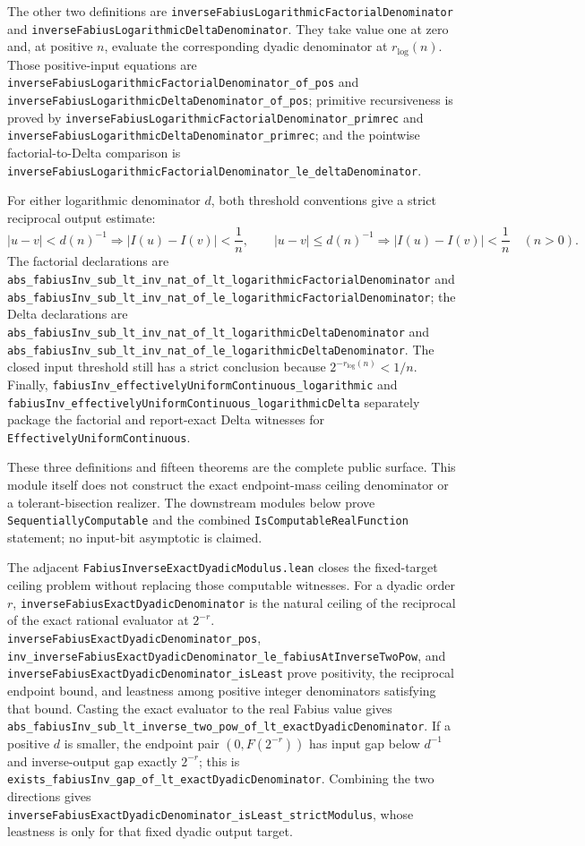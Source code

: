 \documentclass[11pt,oneside]{article}
\theoremstyle{definition}
\theoremstyle{remark}
\begin{document}
The other two definitions are
\nolinkurl{inverseFabiusLogarithmicFactorialDenominator} and
\nolinkurl{inverseFabiusLogarithmicDeltaDenominator}.  They take value one
at zero and, at positive \(n\), evaluate the corresponding dyadic denominator
at \(r_{\log}(n)\).  Those positive-input equations are
\nolinkurl{inverseFabiusLogarithmicFactorialDenominator_of_pos} and
\nolinkurl{inverseFabiusLogarithmicDeltaDenominator_of_pos}; primitive
recursiveness is proved by
\nolinkurl{inverseFabiusLogarithmicFactorialDenominator_primrec} and
\nolinkurl{inverseFabiusLogarithmicDeltaDenominator_primrec}; and the
pointwise factorial-to-Delta comparison is
\nolinkurl{inverseFabiusLogarithmicFactorialDenominator_le_deltaDenominator}.

For either logarithmic denominator \(d\), both threshold conventions give a
strict reciprocal output estimate:
\[
 |u-v|<d(n)^{-1}\Longrightarrow |I(u)-I(v)|<\frac1n,\qquad
 |u-v|\le d(n)^{-1}\Longrightarrow |I(u)-I(v)|<\frac1n
 \quad(n>0).
\]
The factorial declarations are
\nolinkurl{abs_fabiusInv_sub_lt_inv_nat_of_lt_logarithmicFactorialDenominator}
and
\nolinkurl{abs_fabiusInv_sub_lt_inv_nat_of_le_logarithmicFactorialDenominator};
the Delta declarations are
\nolinkurl{abs_fabiusInv_sub_lt_inv_nat_of_lt_logarithmicDeltaDenominator}
and
\nolinkurl{abs_fabiusInv_sub_lt_inv_nat_of_le_logarithmicDeltaDenominator}.
The closed input threshold still has a strict conclusion because
\(2^{-r_{\log}(n)}<1/n\).  Finally,
\nolinkurl{fabiusInv_effectivelyUniformContinuous_logarithmic} and
\nolinkurl{fabiusInv_effectivelyUniformContinuous_logarithmicDelta}
separately package the factorial and report-exact Delta witnesses for
\nolinkurl{EffectivelyUniformContinuous}.

These three definitions and fifteen theorems are the complete public surface.
This module itself does not construct the exact endpoint-mass ceiling
denominator or a tolerant-bisection realizer.  The downstream modules below
prove \nolinkurl{SequentiallyComputable} and the combined
\nolinkurl{IsComputableRealFunction} statement; no input-bit asymptotic is
claimed.

The adjacent \nolinkurl{FabiusInverseExactDyadicModulus.lean} closes the
fixed-target ceiling problem without replacing those computable witnesses.
For a dyadic order \(r\),
\nolinkurl{inverseFabiusExactDyadicDenominator} is the natural ceiling of the
reciprocal of the exact rational evaluator at \(2^{-r}\).
\nolinkurl{inverseFabiusExactDyadicDenominator_pos},
\nolinkurl{inv_inverseFabiusExactDyadicDenominator_le_fabiusAtInverseTwoPow},
and \nolinkurl{inverseFabiusExactDyadicDenominator_isLeast} prove positivity,
the reciprocal endpoint bound, and leastness among positive integer
denominators satisfying that bound.  Casting the exact evaluator to the real
Fabius value gives
\nolinkurl{abs_fabiusInv_sub_lt_inverse_two_pow_of_lt_exactDyadicDenominator}.
If a positive \(d\) is smaller, the endpoint pair \((0,F(2^{-r}))\) has input
gap below \(d^{-1}\) and inverse-output gap exactly \(2^{-r}\); this is
\nolinkurl{exists_fabiusInv_gap_of_lt_exactDyadicDenominator}.  Combining the
two directions gives
\nolinkurl{inverseFabiusExactDyadicDenominator_isLeast_strictModulus}, whose
leastness is only for that fixed dyadic output target.
\end{document}

